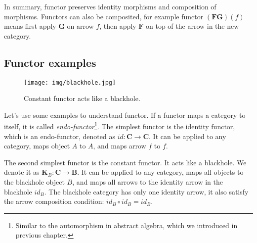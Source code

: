 \documentclass{article}
\begin{document}
In summary, functor preserves identity morphisms and composition of morphisms. Functors can also be composited, for example functor $(\mathbf{F} \mathbf{G})(f)$ means first apply $\mathbf{G}$ on arrow $f$, then apply $\mathbf{F}$ on top of the arrow in the new category.

\subsection{Functor examples}
\label{sec:functor:examples}

\begin{wrapfigure}{R}{0.3\textwidth}
 \centering
 \texttt{[image: img/blackhole.jpg]}
 \captionsetup{labelformat=empty}
 \caption{Constant functor acts like a blackhole.}
 \label{fig:blackhole}
\end{wrapfigure}

 
Let's use some examples to understand functor. If a functor maps a category to itself, it is called {\em endo-functor}\footnote{Similar to the automorphism in abstract algebra, which we introduced in previous chapter.}. The simplest functor is the identity functor, which is an endo-functor, denoted as $id: \pmb{C} \to \pmb{C}$. It can be applied to any category, maps object $A$ to $A$, and maps arrow $f$ to $f$.

The second simplest functor is the constant functor. It acts like a blackhole. We denote it as $\mathbf{K}_B : \pmb{C} \to \pmb{B}$. It can be applied to any category, maps all objects to the blackhole object $B$, and maps all arrows to the identity arrow in the blackhole $id_B$. The blackhole category has only one identity arrow, it also satisfy the arrow composition condition: $id_B \circ id_B = id_B$.
\end{document}
